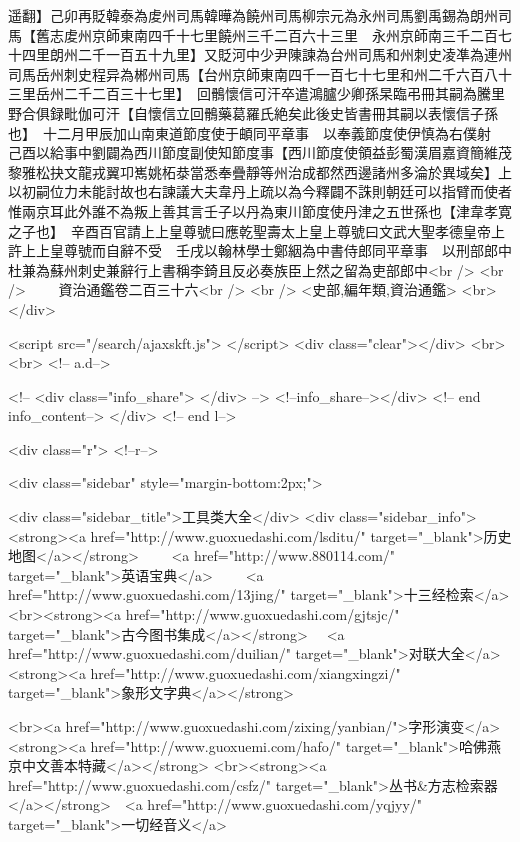 遥翻】己卯再貶韓泰為䖍州司馬韓曄為饒州司馬柳宗元為永州司馬劉禹錫為朗州司馬【舊志䖍州京師東南四千十七里饒州三千二百六十三里　永州京師南三千二百七十四里朗州二千一百五十九里】又貶河中少尹陳諫為台州司馬和州刺史凌凖為連州司馬岳州刺史程异為郴州司馬【台州京師東南四千一百七十七里和州二千六百八十三里岳州二千二百三十七里】　回鶻懷信可汗卒遣鴻臚少卿孫杲臨弔冊其嗣為騰里野合俱録毗伽可汗【自懷信立回鶻藥葛羅氏絶矣此後史皆書冊其嗣以表懷信子孫也】　十二月甲辰加山南東道節度使于頔同平章事　以奉義節度使伊慎為右僕射　己酉以給事中劉闢為西川節度副使知節度事【西川節度使領益彭蜀漢眉嘉資簡維茂黎雅松抉文龍戎翼卭嶲姚柘㳟當悉奉疊靜等州治成都然西邊諸州多淪於異域矣】上以初嗣位力未能討故也右諫議大夫韋丹上疏以為今釋闢不誅則朝廷可以指臂而使者惟兩京耳此外誰不為叛上善其言壬子以丹為東川節度使丹津之五世孫也【津韋孝寛之子也】　辛酉百官請上上皇尊號曰應乾聖壽太上皇上尊號曰文武大聖孝德皇帝上許上上皇尊號而自辭不受　壬戌以翰林學士鄭絪為中書侍郎同平章事　以刑部郎中杜兼為蘇州刺史兼辭行上書稱李錡且反必奏族臣上然之留為吏部郎中<br />
<br />
　　資治通鑑卷二百三十六<br />
<br />
<史部,編年類,資治通鑑>  <br>
   </div> 

<script src="/search/ajaxskft.js"> </script>
 <div class="clear"></div>
<br>
<br>
 <!-- a.d-->

 <!--
<div class="info_share">
</div> 
-->
 <!--info_share--></div>   <!-- end info_content-->
  </div> <!-- end l-->

<div class="r">   <!--r-->



<div class="sidebar"  style="margin-bottom:2px;">

 
<div class="sidebar_title">工具类大全</div>
<div class="sidebar_info">
<strong><a href="http://www.guoxuedashi.com/lsditu/" target="_blank">历史地图</a></strong>　　
<a href="http://www.880114.com/" target="_blank">英语宝典</a>　　
<a href="http://www.guoxuedashi.com/13jing/" target="_blank">十三经检索</a>　
<br><strong><a href="http://www.guoxuedashi.com/gjtsjc/" target="_blank">古今图书集成</a></strong>　
<a href="http://www.guoxuedashi.com/duilian/" target="_blank">对联大全</a>　<strong><a href="http://www.guoxuedashi.com/xiangxingzi/" target="_blank">象形文字典</a></strong>　

<br><a href="http://www.guoxuedashi.com/zixing/yanbian/">字形演变</a>　　<strong><a href="http://www.guoxuemi.com/hafo/" target="_blank">哈佛燕京中文善本特藏</a></strong>
<br><strong><a href="http://www.guoxuedashi.com/csfz/" target="_blank">丛书&方志检索器</a></strong>　<a href="http://www.guoxuedashi.com/yqjyy/" target="_blank">一切经音义</a>　　

